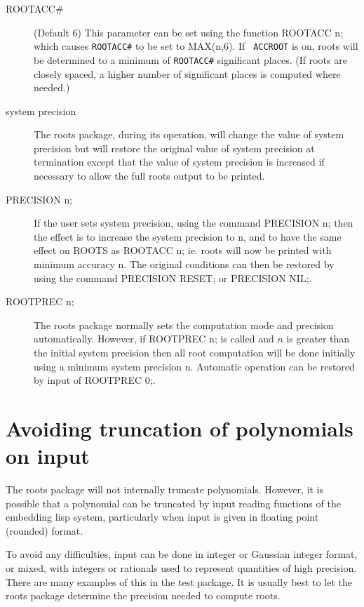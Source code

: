 \begin{description}
\item[ROOTACC\#] (Default 6) This parameter can be set using the function
ROOTACC n; which causes {\tt ROOTACC\#} to be set to MAX(n,6).  If {\tt
ACCROOT} is on, roots will be determined to a minimum of {\tt ROOT\-ACC\#}
significant places. (If roots are closely spaced, a higher number of
significant places is computed where needed.)

\item[system precision] The roots package, during its operation, will
change the value of system precision but will restore the original value
of system precision at termination except that the value of system
precision is increased if necessary to allow the full roots output to be
printed.

\item[PRECISION n;] If the user sets system precision, using the command
PRECISION n; then the effect is to increase the system precision to n, and
to have the same effect on ROOTS as ROOTACC n; ie. roots will now be
printed with minimum accuracy n.  The original conditions can then be
restored by using the command PRECISION RESET; or PRECISION NIL;.

\item[ROOTPREC n;] The roots package normally sets the computation mode and
precision automatically.  However, if ROOTPREC n; is
called and $n$ is greater than the initial system precision then all root
computation will be done initially using a minimum system precision n.
Automatic operation can be restored by input of ROOTPREC 0;.
\end{description}


\section{Avoiding truncation of polynomials on input}

The roots package will not internally truncate polynomials.  However, it
is possible that a polynomial can be truncated by input reading functions
of the embedding lisp system, particularly when input is given in floating
point (rounded) format.

To avoid any difficulties, input can be done in integer or Gaussian
integer format, or mixed, with integers or rationals used to represent
quantities of high precision. There are many examples of this in the
test package.  It is usually best to let the roots package
determine the precision needed to compute roots.

